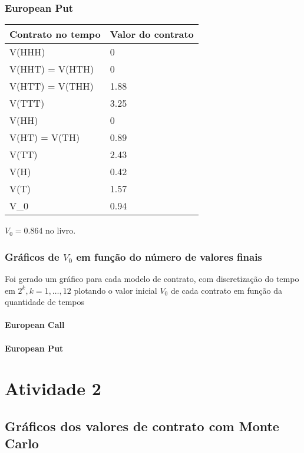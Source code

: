\documentclass[
	11pt,				%
	openright,			%
	oneside,			%
	a4paper,			%
	english,			%
	french,				%
	spanish,			%
	brazil,				%
	]{abntex2}
\begin{document}
\subsection{European Put}
\begin{tabular}{ll}
	\toprule
\multicolumn{1}{c}{Contrato no tempo} & Valor do contrato \\
\midrule
V(HHH) & 0 \\
V(HHT) = V(HTH) & 0 \\
V(HTT) = V(THH) & 1.88 \\
V(TTT) & 3.25 \\
V(HH) & 0 \\
V(HT) = V(TH) & 0.89 \\
V(TT) & 2.43 \\
V(H) & 0.42 \\
V(T) & 1.57 \\
V_0 & 0.94
\end{tabular}
\(V_0 = 0.864\) no livro.


\subsection{Gráficos de \(V_0\) em função do número de valores finais}
Foi gerado um gráfico para cada modelo de contrato, com discretização do tempo em \(2^k, k = 1,\dots, 12\) plotando o valor inicial \(V_0\) de cada contrato em função da quantidade de tempos
\newpage
\subsubsection{European Call}
\begin{figure}[h]
\end{figure}
\subsubsection{European Put}
\begin{figure}[h]
\end{figure}


\chapter{Atividade 2}
\section{Gráficos dos valores de contrato com Monte Carlo}
\end{document}
